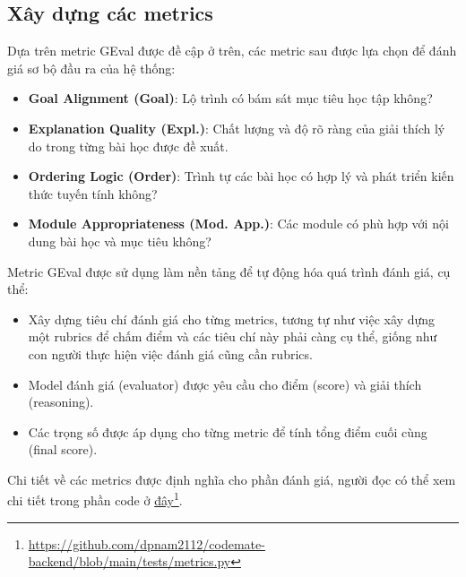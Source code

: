 \subsection{Xây dựng các metrics}
Dựa trên metric GEval được đề cập ở trên, các metric sau được lựa chọn để đánh giá sơ bộ đầu ra của hệ thống:
\begin{itemize}
    \item \textbf{Goal Alignment (Goal)}: Lộ trình có bám sát mục tiêu học tập không?
    \item \textbf{Explanation Quality (Expl.)}: Chất lượng và độ rõ ràng của giải thích lý do trong từng bài học được đề xuất.
    \item \textbf{Ordering Logic (Order)}: Trình tự các bài học có hợp lý và phát triển kiến thức tuyến tính không?
    \item \textbf{Module Appropriateness (Mod. App.)}: Các module có phù hợp với nội dung bài học và mục tiêu không?
\end{itemize}

Metric GEval được sử dụng làm nền tảng để tự động hóa quá trình đánh giá, cụ thể:
\begin{itemize}
    \item Xây dựng tiêu chí đánh giá cho từng metrics, tương tự như việc xây dựng một rubrics để chấm điểm và các tiêu chí này phải càng cụ thể, giống như con người thực hiện việc đánh giá cũng cần rubrics.
    \item Model đánh giá (evaluator) được yêu cầu cho điểm (score) và giải thích (reasoning).
    \item Các trọng số được áp dụng cho từng metric để tính tổng điểm cuối cùng (final score).
\end{itemize}
Chi tiết về các metrics được định nghĩa cho phần đánh giá, người đọc có thể xem chi tiết trong phần code ở \href{https://github.com/dpnam2112/codemate-backend/blob/main/tests/metrics.py}{đây}\footnote{\url{https://github.com/dpnam2112/codemate-backend/blob/main/tests/metrics.py}}.

